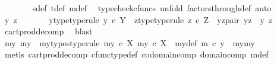 \begin{isabellebody}
\ \ \ \ \ \ \isamarkupfalse%
\ s{\isacharunderscore}{\kern0pt}def\ t{\isacharunderscore}{\kern0pt}def\ m{\isacharunderscore}{\kern0pt}def\ \isamarkupfalse%
\ {\isacharparenleft}{\kern0pt}typecheck{\isacharunderscore}{\kern0pt}cfuncs{\isacharcomma}{\kern0pt}\ unfold\ factors{\isacharunderscore}{\kern0pt}through{\isacharunderscore}{\kern0pt}def{}{\isacharcomma}{\kern0pt}\ auto{\isacharparenright}{\kern0pt}\isanewline
\ \ \ \ \isamarkupfalse%
\ \isamarkupfalse%
\ y\ z\ \isanewline
\ \ \ \ \ \ y{\isacharunderscore}{\kern0pt}type{\isacharbrackleft}{\kern0pt}type{\isacharunderscore}{\kern0pt}rule{\isacharbrackright}{\kern0pt}{\isacharcolon}{\kern0pt}\ {\isachardoublequoteopen}y\ {\isasymin}\isactrlsub c\ Y{\isachardoublequoteclose}\ \ z{\isacharunderscore}{\kern0pt}type{\isacharbrackleft}{\kern0pt}type{\isacharunderscore}{\kern0pt}rule{\isacharbrackright}{\kern0pt}{\isacharcolon}{\kern0pt}\ {\isachardoublequoteopen}z\ {\isasymin}\isactrlsub c\ Z{\isachardoublequoteclose}\ \ yz{\isacharunderscore}{\kern0pt}pair{\isacharcolon}{\kern0pt}\ {\isachardoublequoteopen}yz\ {\isacharequal}{\kern0pt}\ {\isasymlangle}y{\isacharcomma}{\kern0pt}\ z{\isasymrangle}{\isachardoublequoteclose}\isanewline
\ \ \ \ \ \ \isamarkupfalse%
\ cart{\isacharunderscore}{\kern0pt}prod{\isacharunderscore}{\kern0pt}decomp\ \isamarkupfalse%
\ blast\isanewline
\ \ \ \ \isamarkupfalse%
\ \isamarkupfalse%
\ my{}\ my{}\ \ my{\isacharunderscore}{\kern0pt}types{\isacharbrackleft}{\kern0pt}type{\isacharunderscore}{\kern0pt}rule{\isacharbrackright}{\kern0pt}{\isacharcolon}{\kern0pt}\ {\isachardoublequoteopen}my{}\ {\isasymin}\isactrlsub c\ X{\isachardoublequoteclose}\ {\isachardoublequoteopen}my{}\ {\isasymin}\isactrlsub c\ X{\isachardoublequoteclose}\ \ my{\isacharunderscore}{\kern0pt}def{\isacharcolon}{\kern0pt}\ {\isachardoublequoteopen}m\ {\isasymcirc}\isactrlsub c\ y\ {\isacharequal}{\kern0pt}\ {\isasymlangle}my{}{\isacharcomma}{\kern0pt}my{}{\isasymrangle}{\isachardoublequoteclose}\isanewline
\ \ \ \ \ \ \isamarkupfalse%
\ {\isacharparenleft}{\kern0pt}metis\ cart{\isacharunderscore}{\kern0pt}prod{\isacharunderscore}{\kern0pt}decomp\ cfunc{\isacharunderscore}{\kern0pt}type{\isacharunderscore}{\kern0pt}def\ codomain{\isacharunderscore}{\kern0pt}comp\ domain{\isacharunderscore}{\kern0pt}comp\ m{\isacharunderscore}{\kern0pt}def{\isacharparenleft}{\kern0pt}{}{\isacharparenright}{\kern0pt}{\isacharparenright}{\kern0pt}\isanewline

\end{isabellebody}
